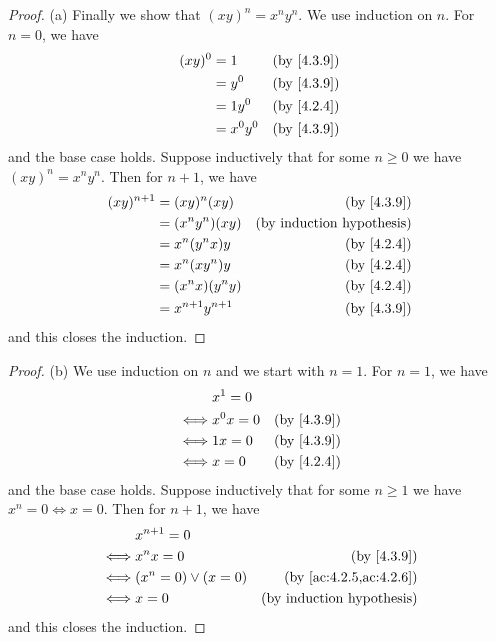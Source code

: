 \begin{proof}{(a)}
  Finally we show that \((xy)^n = x^n y^n\).
  We use induction on \(n\).
  For \(n = 0\), we have
  \begin{align*}
    (xy)^0 & = 1       & \text{(by \cref{4.3.9})} \\
           & = y^0     & \text{(by \cref{4.3.9})} \\
           & = 1y^0    & \text{(by \cref{4.2.4})} \\
           & = x^0 y^0 & \text{(by \cref{4.3.9})}
  \end{align*}
  and the base case holds.
  Suppose inductively that for some \(n \geq 0\) we have \((xy)^n = x^n y^n\).
  Then for \(n + 1\), we have
  \begin{align*}
    (xy)^{n + 1} & = (xy)^n (xy)         & \text{(by \cref{4.3.9})}         \\
                 & = (x^n y^n) (xy)      & \text{(by induction hypothesis)} \\
                 & = x^n (y^n x) y       & \text{(by \cref{4.2.4})}         \\
                 & = x^n (x y^n) y       & \text{(by \cref{4.2.4})}         \\
                 & = (x^n x)(y^n y)      & \text{(by \cref{4.2.4})}         \\
                 & = x^{n + 1} y^{n + 1} & \text{(by \cref{4.3.9})}
  \end{align*}
  and this closes the induction.
\end{proof}

\begin{proof}{(b)}
  We use induction on \(n\) and we start with \(n = 1\).
  For \(n = 1\), we have
  \begin{align*}
         & x^1 = 0                              \\
    \iff & x^0 x = 0 & \text{(by \cref{4.3.9})} \\
    \iff & 1x = 0    & \text{(by \cref{4.3.9})} \\
    \iff & x = 0     & \text{(by \cref{4.2.4})}
  \end{align*}
  and the base case holds.
  Suppose inductively that for some \(n \geq 1\) we have \(x^n = 0 \iff x = 0\).
  Then for \(n + 1\), we have
  \begin{align*}
         & x^{n + 1} = 0                                                 \\
    \iff & x^n x = 0              & \text{(by \cref{4.3.9})}             \\
    \iff & (x^n = 0) \lor (x = 0) & \text{(by \cref{ac:4.2.5,ac:4.2.6})} \\
    \iff & x = 0                  & \text{(by induction hypothesis)}
  \end{align*}
  and this closes the induction.
\end{proof}

